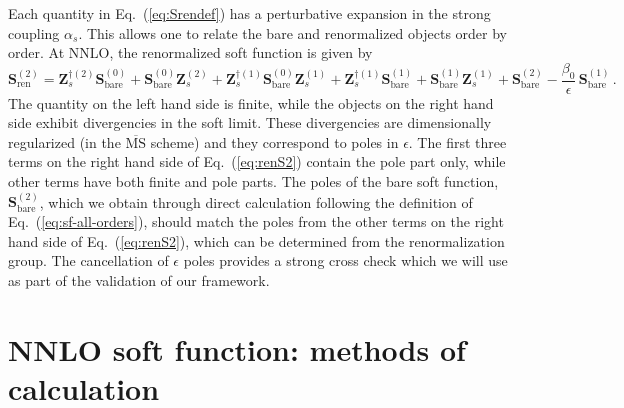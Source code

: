 \documentclass{PoS}
\newcommand{\bfS}{\bm{S}}
\newcommand{\bfZ}{\bm{Z}}
\newcommand{\bare}{\text{bare}}
\begin{document}
Each quantity in Eq.~(\ref{eq:Srendef}) has a perturbative expansion in 
the strong coupling $\alpha_s$. This allows one to relate the bare and
renormalized objects order by order. At NNLO, the renormalized soft function
is given by
%
\begin{equation}
  \bfS^{(2)}_\text{ren} = 
  \bfZ^{\dagger (2)}_s \bfS^{(0)}_\bare  + 
  \bfS^{(0)}_\bare \bfZ^{(2)}_s  +
  \bfZ^{\dagger (1)}_s \bfS^{(0)}_\bare \bfZ^{(1)}_s 
  +
  \bfZ^{\dagger (1)}_s \bfS^{(1)}_\bare  + 
  \bfS^{(1)}_\bare \bfZ^{(1)}_s  +
  \bfS^{(2)}_\bare
  -\frac{\beta_0}{\epsilon}\, \bfS^{(1)}_\bare \,.
  \label{eq:renS2}
\end{equation}
%
The quantity on the left hand side is finite, while the objects on the right
hand side exhibit divergencies in the soft limit. These divergencies are
dimensionally regularized (in the $\overline{\text{MS}}$ scheme) and they
correspond to poles in $\epsilon$. The first three terms on the right hand side
of Eq.~(\ref{eq:renS2}) contain the pole part only, while other terms have both
finite and pole parts. The poles of the bare soft function, $\bfS^{(2)}_\bare$,
which we obtain through direct calculation following the definition of
Eq.~(\ref{eq:sf-all-orders}), should match the poles from the other terms on the
right hand side of Eq.~(\ref{eq:renS2}), which can be determined from the
renormalization group. The cancellation of $\epsilon$ poles provides a strong
cross check which we will use as part of the validation of our framework.


\section{NNLO soft function: methods of calculation}
\end{document}
